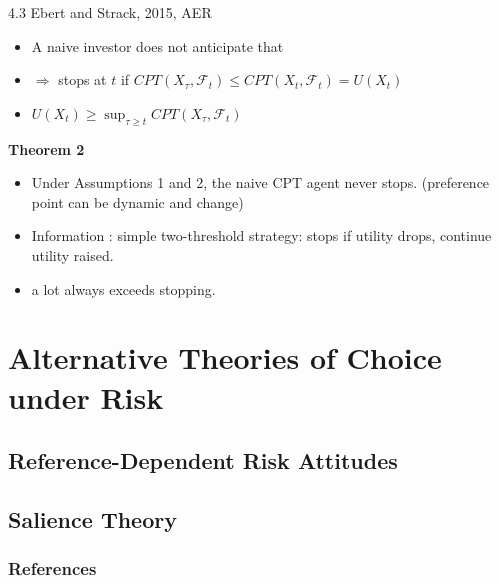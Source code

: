 \documentclass[11pt, aspectratio=169]{beamer}
\begin{document}
\begin{frame}{4.3 Ebert and Strack, 2015, AER}
    \begin{itemize}
        \item A naive investor does not anticipate that\medskip
        \item $\Rightarrow$ stops at $t$ if  $CPT(X_\tau,\mathcal{F}_t) \leq CPT(X_t,\mathcal{F}_t)=U(X_t) $\medskip
        \item $U(X_t) \geq \sup_{\tau \geq t} CPT(X_\tau,\mathcal{F}_t)$
    \end{itemize}
 \textbf{Theorem 2}\\
    \begin{itemize}
        \item Under Assumptions 1 and 2, the naive CPT agent never stops. (preference point can be dynamic and change)\medskip
        \item Information : simple two-threshold strategy: stops if utility drops, continue utility raised.\medskip
        \item a lot always exceeds stopping.\medskip
	\end{itemize}
\end{frame}




\section{Alternative Theories of Choice under Risk}
\subsection{Reference-Dependent Risk Attitudes}
\subsection{Salience Theory}

\begin{frame}[allowframebreaks]
    \frametitle{References}
    \renewcommand{\bibfont}{\normalfont\footnotesize}
    \printbibliography
\end{frame}
\end{document}
